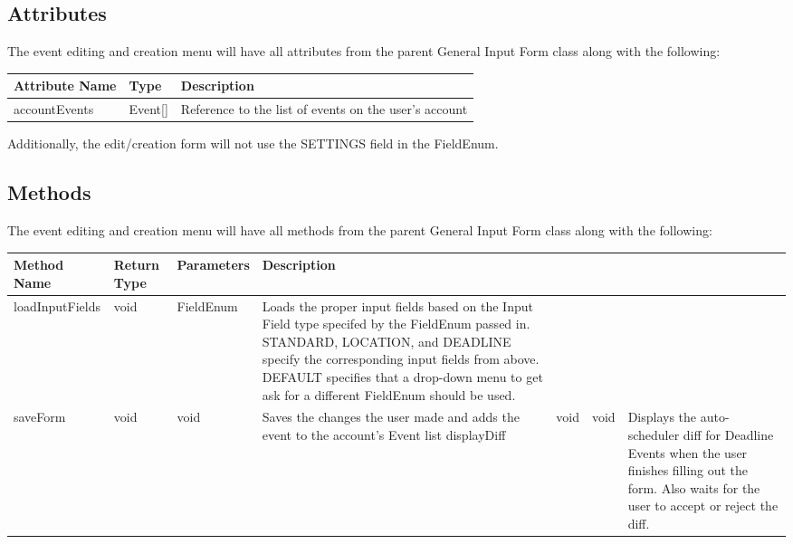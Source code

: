 \documentclass{scrreprt}
\begin{document}
\subsection{Attributes}

The event editing and creation menu will have all attributes from the parent General Input Form class along with the following:

\begin{center}
\begin{longtable}{ | p{3cm} | p{3cm} | p{9cm} | }
\hline
\textbf{Attribute Name} & \textbf{Type} & \textbf{Description} \\
\hline
accountEvents & Event[] & Reference to the list of events on the user's account \\
\hline
\end{longtable}
\end{center}

Additionally, the edit/creation form will not use the SETTINGS field in the FieldEnum.

\subsection{Methods}

The event editing and creation menu will have all methods from the parent General Input Form class along with the following:

\begin{center}
\begin{longtable}{ | p{3cm} | p{1cm} | p{2cm} | p{9cm} | }
\hline
\textbf{Method Name} & \textbf{Return Type} & \textbf{Parameters} & \textbf{Description} \\
\hline
loadInputFields & void & FieldEnum & Loads the proper input fields based on the Input Field type specifed by the FieldEnum passed in. STANDARD, LOCATION, and DEADLINE specify the corresponding input fields from above.  DEFAULT specifies that a drop-down menu to get ask for a different FieldEnum should be used. \\
\hline
saveForm & void & void & Saves the changes the user made and adds the event to the account's Event list
\hline
displayDiff & void & void & Displays the auto-scheduler diff for Deadline Events when the user finishes filling out the form. Also waits for the user to accept or reject the diff. \\
\hline
\end{longtable}
\end{center}
\end{document}
